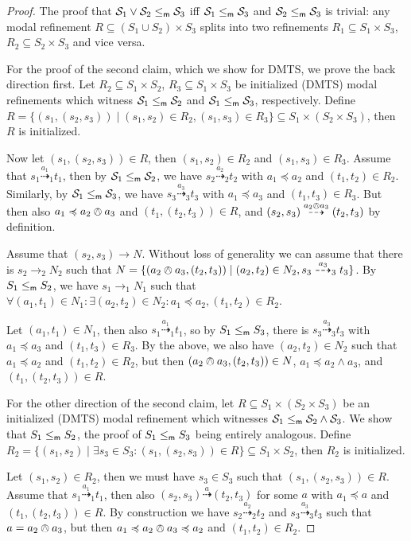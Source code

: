 \documentclass[twocolumn]{svjour3-dummy}
\newcommand*\labpre{\preccurlyeq}
\newcommand*\oland{\owedge}
\newcommand*{\must}[1]{\overset{#1}{\longrightarrow}}
\newcommand*{\may}[1]{\overset{#1}{\dashrightarrow}}
\newcommand*\mr{\le_\textup{\textsf{m}}}
\newcommand*\cS{\mathcal S}
\begin{document}
\begin{proof}The proof that $\cS_1\lor \cS_2\mr \cS_3$ iff $\cS_1\mr \cS_3$ and
  $\cS_2\mr \cS_3$ is trivial: any modal refinement $R\subseteq( S_1\cup
  S_2)\times S_3$ splits into two refinements $R_1\subseteq S_1\times
  S_3$, $R_2\subseteq S_2\times S_3$ and vice versa.

  For the proof of the second claim, which we show for DMTS, we prove
  the back direction first.  Let $R_2\subseteq S_1\times S_2$,
  $R_3\subseteq S_1\times S_3$ be initialized (DMTS) modal refinements
  which witness $\cS_1\mr \cS_2$ and $\cS_1\mr \cS_3$, respectively.
  Define $R=\{( s_1,( s_2, s_3))\mid( s_1, s_2)\in R_2,( s_1, s_3)\in
  R_3\}\subseteq S_1\times( S_2\times S_3)$, then $R$ is initialized.

  Now let $( s_1,( s_2, s_3))\in R$, then $( s_1, s_2)\in R_2$ and $(
  s_1, s_3)\in R_3$.  Assume that $s_1\may{ a_1}_1 t_1$, then by
  $\cS_1\mr \cS_2$, we have $s_2\may{ a_2}_2 t_2$ with $a_1\labpre a_2$
  and $( t_1, t_2)\in R_2$.  Similarly, by $\cS_1\mr \cS_3$, we have
  $s_3\may{ a_3}_3 t_3$ with $a_1\labpre a_3$ and $( t_1, t_3)\in R_3$.
  But then also $a_1\labpre a_2\oland a_3$ and $( t_1,( t_2, t_3))\in
  R$, and $( s_2, s_3)\may{ a_2\oland a_3}( t_2, t_3)$ by definition.

  Assume that $( s_2, s_3)\must{} N$.  Without loss of generality we can
  assume that there is $s_2\must{}_2 N_2$ such that $N=\{( a_2\oland
  a_3,( t_2, t_3))\mid( a_2, t_2)\in N_2, s_3\may{ a_3}_3 t_3\}$.  By
  $S_1\mr S_2$, we have $s_1\must{}_1 N_1$ such that $\forall( a_1,
  t_1)\in N_1: \exists( a_2, t_2)\in N_2: a_1\labpre a_2,( t_1, t_2)\in
  R_2$.

  Let $( a_1, t_1)\in N_1$, then also $s_1\may{ a_1}_1 t_1$, so by
  $S_1\mr S_3$, there is $s_3\may{ a_3}_3 t_3$ with $a_1\labpre a_3$ and
  $( t_1, t_3)\in R_3$.  By the above, we also have $( a_2, t_2)\in N_2$
  such that $a_1\labpre a_2$ and $( t_1, t_2)\in R_2$, but then $(
  a_2\oland a_3,( t_2, t_3))\in N$, $a_1\labpre a_2\land a_3$, and $(
  t_1,( t_2, t_3))\in R$.

  For the other direction of the second claim, let $R\subseteq
  S_1\times( S_2\times S_3)$ be an initialized (DMTS) modal refinement
  which witnesses $\cS_1\mr \cS_2\land \cS_3$.  We show that $S_1\mr
  S_2$, the proof of $S_1\mr S_3$ being entirely analogous.  Define
  $R_2=\{( s_1, s_2)\mid \exists s_3\in S_3:( s_1,( s_2, s_3))\in
  R\}\subseteq S_1\times S_2$, then $R_2$ is initialized.

  Let $( s_1, s_2)\in R_2$, then we must have $s_3\in S_3$ such that $(
  s_1,( s_2, s_3))\in R$.  Assume that $s_1\may{ a_1}_1 t_1$, then also
  $( s_2, s_3)\may{ a}( t_2, t_3)$ for some $a$ with $a_1\labpre a$ and
  $( t_1,( t_2, t_3))\in R$.  By construction we have $s_2\may{ a_2}_2
  t_2$ and $s_3\may{ a_3}_3 t_3$ such that $a= a_2\oland a_3$, but then
  $a_1\labpre a_2\oland a_3\labpre a_2$ and $( t_1, t_2)\in R_2$.


\end{proof}
\end{document}
